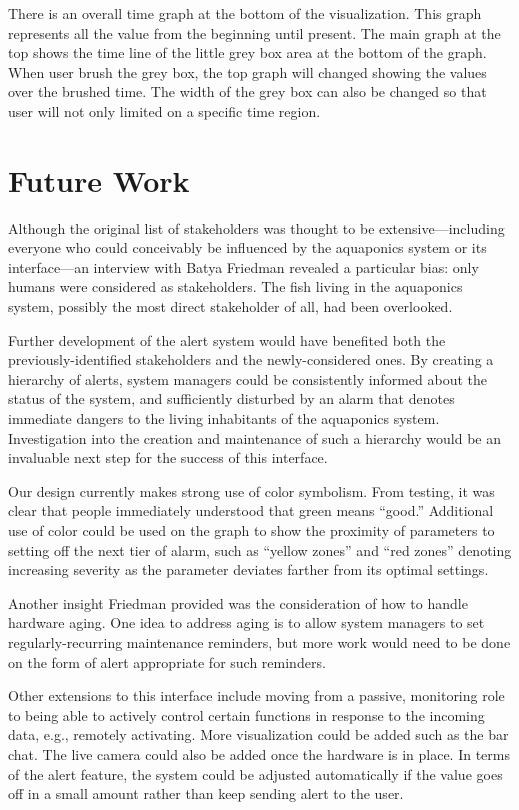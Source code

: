 \documentclass{sigchi}
\begin{document}
There is an overall time graph at the bottom of the visualization. This graph represents all the value from the beginning until present. The main graph at the top shows the time line of the little grey box area at the bottom of the graph. When user brush the grey box, the top graph will changed showing the values over the brushed time. The width of the grey box can also be changed so that user will not only limited on a specific time region. 

\section{Future Work}
Although the original list of stakeholders was thought to be extensive---including everyone who could conceivably be influenced by the aquaponics system or its interface---an interview with Batya Friedman revealed a particular bias: only humans were considered as stakeholders. The fish living in the aquaponics system, possibly the most direct stakeholder of all, had been overlooked. 

Further development of the alert system would have benefited both the previously-identified stakeholders and the newly-considered ones. By creating a hierarchy of alerts, system managers could be consistently informed about the status of the system, and sufficiently disturbed by an alarm that denotes immediate dangers to the living inhabitants of the aquaponics system. Investigation into the creation and maintenance of such a hierarchy would be an invaluable next step for the success of this interface. 

Our design currently makes strong use of color symbolism. From testing, it was clear that people immediately understood that green means ``good.'' Additional use of color could be used on the graph to show the proximity of parameters to setting off the next tier of alarm, such as ``yellow zones'' and ``red zones'' denoting increasing severity as the parameter deviates farther from its optimal settings.

Another insight Friedman provided was the consideration of how to handle hardware aging. One idea to address aging is to allow system managers to set regularly-recurring maintenance reminders, but more work would need to be done on the form of alert appropriate for such reminders.  

Other extensions to this interface include moving from a passive, monitoring role to being able to actively control certain functions in response to the incoming data, e.g., remotely activating. More visualization could be added such as the bar chat. The live camera could also be added once the hardware is in place. In terms of the alert feature, the system could be adjusted automatically if the value goes off in a small amount rather than keep sending alert to the user.
\end{document}
